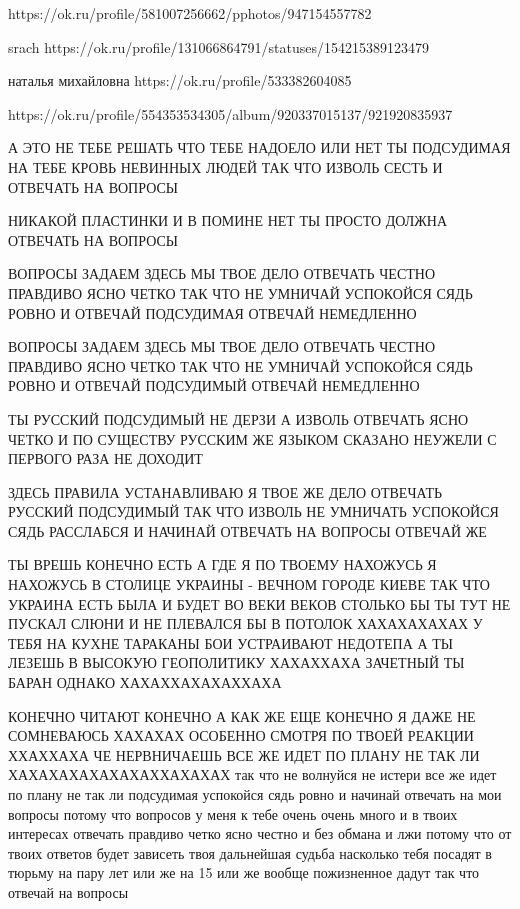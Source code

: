  
 
 
 
 


https://ok.ru/profile/581007256662/pphotos/947154557782

srach
https://ok.ru/profile/131066864791/statuses/154215389123479

наталья михайловна
https://ok.ru/profile/533382604085

https://ok.ru/profile/554353534305/album/920337015137/921920835937

А ЭТО НЕ ТЕБЕ РЕШАТЬ ЧТО ТЕБЕ НАДОЕЛО ИЛИ НЕТ ТЫ ПОДСУДИМАЯ НА ТЕБЕ КРОВЬ
НЕВИННЫХ ЛЮДЕЙ ТАК ЧТО ИЗВОЛЬ СЕСТЬ И ОТВЕЧАТЬ НА ВОПРОСЫ

НИКАКОЙ ПЛАСТИНКИ И В ПОМИНЕ НЕТ ТЫ ПРОСТО ДОЛЖНА ОТВЕЧАТЬ НА ВОПРОСЫ

ВОПРОСЫ ЗАДАЕМ ЗДЕСЬ МЫ ТВОЕ ДЕЛО ОТВЕЧАТЬ ЧЕСТНО ПРАВДИВО ЯСНО ЧЕТКО ТАК ЧТО
НЕ УМНИЧАЙ УСПОКОЙСЯ СЯДЬ РОВНО И ОТВЕЧАЙ ПОДСУДИМАЯ ОТВЕЧАЙ НЕМЕДЛЕННО

ВОПРОСЫ ЗАДАЕМ ЗДЕСЬ МЫ ТВОЕ ДЕЛО ОТВЕЧАТЬ ЧЕСТНО ПРАВДИВО ЯСНО ЧЕТКО ТАК ЧТО
НЕ УМНИЧАЙ УСПОКОЙСЯ СЯДЬ РОВНО И ОТВЕЧАЙ ПОДСУДИМЫЙ ОТВЕЧАЙ НЕМЕДЛЕННО

ТЫ РУССКИЙ ПОДСУДИМЫЙ НЕ ДЕРЗИ А ИЗВОЛЬ ОТВЕЧАТЬ ЯСНО ЧЕТКО И ПО СУЩЕСТВУ
РУССКИМ ЖЕ ЯЗЫКОМ СКАЗАНО НЕУЖЕЛИ С ПЕРВОГО РАЗА НЕ ДОХОДИТ

ЗДЕСЬ ПРАВИЛА УСТАНАВЛИВАЮ Я ТВОЕ ЖЕ ДЕЛО ОТВЕЧАТЬ РУССКИЙ ПОДСУДИМЫЙ ТАК ЧТО
ИЗВОЛЬ НЕ УМНИЧАТЬ УСПОКОЙСЯ СЯДЬ РАССЛАБСЯ И НАЧИНАЙ ОТВЕЧАТЬ НА ВОПРОСЫ
ОТВЕЧАЙ ЖЕ

ТЫ ВРЕШЬ КОНЕЧНО ЕСТЬ А ГДЕ Я ПО ТВОЕМУ НАХОЖУСЬ Я НАХОЖУСЬ В СТОЛИЦЕ УКРАИНЫ -
ВЕЧНОМ ГОРОДЕ КИЕВЕ ТАК ЧТО УКРАИНА ЕСТЬ БЫЛА И БУДЕТ ВО ВЕКИ ВЕКОВ СТОЛЬКО БЫ
ТЫ ТУТ НЕ ПУСКАЛ СЛЮНИ И НЕ ПЛЕВАЛСЯ БЫ В ПОТОЛОК ХАХАХАХАХАХ У ТЕБЯ НА КУХНЕ
ТАРАКАНЫ БОИ УСТРАИВАЮТ НЕДОТЕПА А ТЫ ЛЕЗЕШЬ В ВЫСОКУЮ ГЕОПОЛИТИКУ ХАХАХХАХА
ЗАЧЕТНЫЙ ТЫ БАРАН ОДНАКО ХАХАХХАХАХАХХАХА

КОНЕЧНО ЧИТАЮТ КОНЕЧНО А КАК ЖЕ ЕЩЕ КОНЕЧНО Я ДАЖЕ НЕ СОМНЕВАЮСЬ ХАХАХАХ
ОСОБЕННО СМОТРЯ ПО ТВОЕЙ РЕАКЦИИ ХХАХХАХА ЧЕ НЕРВНИЧАЕШЬ ВСЕ ЖЕ ИДЕТ ПО ПЛАНУ
НЕ ТАК ЛИ ХАХАХАХАХАХАХАХХАХАХАХ так что не волнуйся не истери все же идет по плану не так 
ли подсудимая успокойся сядь ровно и начинай отвечать на мои вопросы потому что вопросов у меня к тебе 
очень очень много и в твоих интересах отвечать правдиво четко ясно честно и без обмана и лжи
потому что от твоих ответов будет зависеть твоя дальнейшая судьба насколько тебя посадят в тюрьму
на пару лет или же на 15 или же вообще пожизненное дадут так что отвечай на вопросы

